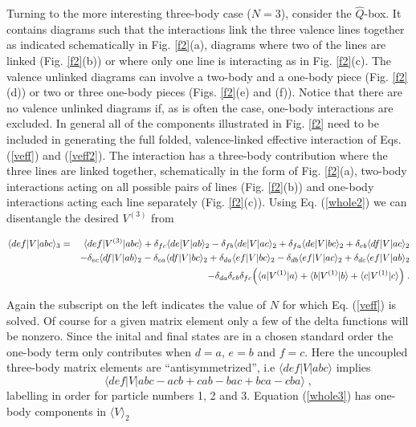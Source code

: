 \documentclass[prc,aps,amsmath,amssymb,preprintnumbers,showpacs,twocolumn]{revtex4}
\newcommand{\bq}{\begin{eqnarray}}
\newcommand{\eq}{\end{eqnarray}}
\begin{document}
Turning to the more interesting three-body case ($N=3$), consider the 
$\hat{Q}$-box. It contains diagrams such that the interactions link 
the three valence lines together as indicated schematically in 
Fig. \ref{f2}(a), diagrams where two of the lines are linked 
(Fig. \ref{f2}(b)) or where only one line is interacting as in 
Fig. \ref{f2}(c). The valence unlinked diagrams can involve a two-body
and a one-body piece (Fig. \ref{f2}(d)) or two or three one-body pieces
(Figs. \ref{f2}(e) and (f)). Notice that there are no valence unlinked 
diagrams if, as is often the case, one-body interactions are excluded.
In general all of the components illustrated in Fig. \ref{f2} need to 
be included in generating the full folded, valence-linked effective 
interaction of Eqs. (\ref{veff}) and (\ref{veff2}). %
The interaction has a three-body 
contribution where the three lines are linked together, schematically in 
the form of Fig. \ref{f2}(a), two-body interactions acting on all possible
pairs of lines (Fig. \ref{f2}(b)) and one-body interactions 
acting each line separately (Fig. \ref{f2}(c)). Using Eq. (\ref{whole2})
we can disentangle the desired $V^{(3)}$ from 
\begin{widetext}
\bq
\langle def|V|abc\rangle_3&=&\langle def|V^{(3)}|abc\rangle
+\delta_{fc}\langle de|V|ab\rangle_2-\delta_{fb}
\langle de|V|ac\rangle_2+\delta_{fa}\langle de|V|bc\rangle_2
+\delta_{eb}\langle df|V|ac\rangle_2\nonumber\\
&&-\delta_{ec}\langle df|V|ab\rangle_2-\delta_{ea}
\langle df|V|bc\rangle_2+\delta_{da}\langle ef|V|bc\rangle_2
-\delta_{db}\langle ef|V|ac\rangle_2
+\delta_{dc}\langle ef|V|ab\rangle_2\nonumber\\
&&
-\delta_{da}\delta_{eb}\delta_{fc}
\Bigl(\langle a|V^{(1)}|a\rangle+\langle b|V^{(1)}|b\rangle
+\langle c|V^{(1)}|c\rangle\Bigr)\;. \label{whole3}
\eq
\end{widetext}
Again the subscript on the left indicates the value of $N$ for which 
Eq. (\ref{veff}) is solved. Of course for a given matrix element only 
a few of the delta functions will be nonzero.
Since the inital and final states are in a chosen standard order
the one-body term only contributes when $d=a$, $e=b$ and $f=c$.
Here the uncoupled three-body matrix elements are ``antisymmetrized'', 
i.e $\langle def|V|abc\rangle$
implies 
\begin{displaymath}
\langle def|V|abc-acb+cab-bac+bca-cba\rangle\;,
\end{displaymath}
labelling in order for particle numbers 1, 2 and 3. Equation 
(\ref{whole3}) has one-body components in $\langle V\rangle_2$
\end{document}
